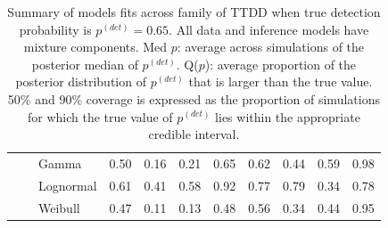\documentclass[useAMS,usenatbib,referee,12pt]{article}
\newcommand{\pdet}{p^{(det)}}
\begin{document}
\begin{table}[ht]
\begin{tabular}{l|l|l|cccc|cccc}
\cline{2-11}
& \parbox[t]{2mm}{} & Gamma & 0.50 & 0.16 & 0.21 & 0.65 & 0.62 & 0.44 & 0.59 & 0.98 \\ 
   &  & Lognormal & 0.61 & 0.41 & 0.58 & 0.92 & 0.77 & 0.79 & 0.34 & 0.78 \\ 
   &  & Weibull & 0.47 & 0.11 & 0.13 & 0.48 & 0.56 & 0.34 & 0.44 & 0.95 \\ 
   \hline
\end{tabular}
\caption{Summary of models fits across family of TTDD when true detection probability is $\pdet = 0.65$.
All data and inference models have mixture components.
Med $p$: average across simulations of the posterior median of $\pdet$.  
Q($p$): average proportion of the posterior distribution of $\pdet$ that is larger than the true value.  
50\% and 90\% coverage is expressed as the proportion of simulations for which the true value of $\pdet$ lies within the appropriate credible interval.}
\label{tbl:sim2}
\end{table}
\end{document}
